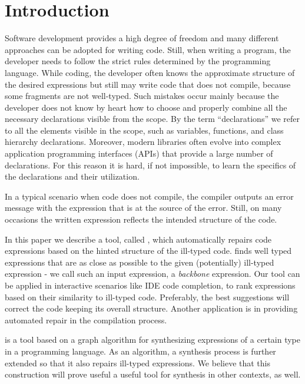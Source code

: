 \section{Introduction}

Software development provides a high degree of freedom and
many different approaches can be adopted for writing
code. Still, when writing a program, the developer needs to follow
the strict rules determined by the programming language. While coding, the developer often knows the
approximate structure of the desired expressions but still may write code
that does not compile, because some fragments are not well-typed.
Such mistakes occur mainly because the developer does not
know by heart how to choose and properly combine all the necessary
declarations visible from the scope. By the term ``declarations'' 
we refer to all the elements visible in the scope, such as variables, functions, and class
hierarchy declarations.
Moreover, modern libraries often evolve into complex 
application programming interfaces (APIs) that provide
a large number of declarations. For this reason 
it is hard, if not impossible, to learn the specifics of
the declarations and their utilization.

In a typical scenario when code does not compile, the compiler outputs
an error message with the expression that is at the source of the
error. Still, on many occasions the written expression reflects the
intended structure of the code. 

In this paper we describe a tool, called \ourTool, which
automatically repairs code expressions based on the hinted structure
of the ill-typed code. \ourTool finds well typed expressions that are as close as 
possible to the given (potentially) ill-typed expression - we call such an
input expression, a {\em backbone} expression. Our tool can be applied 
in interactive scenarios like IDE code completion, to rank expressions 
based on their similarity to ill-typed code. Preferably, the best
suggestions will correct the code keeping its overall structure.
Another application is in providing automated repair in the compilation process.

\ourTool is a tool based on a graph algorithm for synthesizing expressions of a certain type in a programming language. As an algorithm, a synthesis process is further 
extended so that it also repairs ill-typed expressions. We believe that this construction will prove useful a useful tool for synthesis in other contexts, as well.


